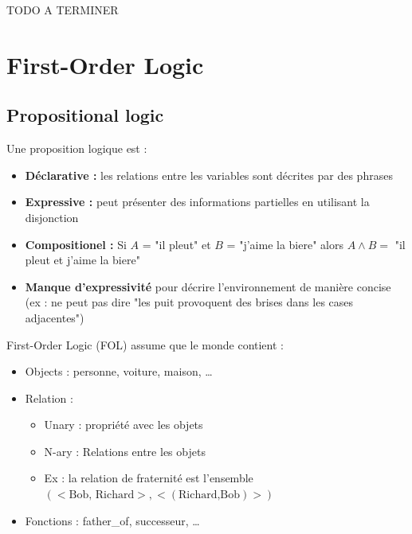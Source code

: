 \documentclass[12pt]{article}
\begin{document}
		TODO A TERMINER
		
\section{First-Order Logic}
	\subsection{Propositional logic}
		Une proposition logique est :
		\begin{itemize}
			\item \textbf{Déclarative :} les relations entre les variables sont décrites par des phrases
			\item \textbf{Expressive :} peut présenter des informations partielles en utilisant la disjonction
			\item \textbf{Compositionel :} Si $A$ = "il pleut" et $B$ = "j'aime la biere" alors $A \wedge B =$ "il pleut et j'aime la biere"
			\item \textbf{Manque d'expressivité} pour décrire l'environnement de manière concise (ex : ne peut pas dire "les puit provoquent des brises dans les cases adjacentes")
		\end{itemize}
		
		First-Order Logic (FOL) assume que le monde contient :
		\begin{itemize}
			\item Objects : personne, voiture, maison, \dots
			\item Relation : 
			\begin{itemize}
				\item Unary : propriété avec les objets
				\item N-ary : Relations entre les objets
				\item Ex : la relation de fraternité est l'ensemble $(<\text{Bob, Richard}>,<(\text{Richard,Bob})>)$
			\end{itemize}
			\item Fonctions : father\_of, successeur, \dots
		\end{itemize}
\end{document}
